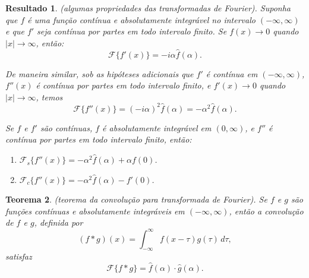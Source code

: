 \documentclass{article}
\theoremstyle{plain}
\newtheorem{thm}{Teorema}[section]
\newtheorem{res}[thm]{Resultado}
\theoremstyle{definition}
\theoremstyle{remark}
\begin{document}
\begin{res} (algumas propriedades das transformadas de Fourier).
    Suponha que \(f\) é uma função contínua e absolutamente integrável no intervalo \((-\infty, \infty)\) e que \(f'\) seja contínua por partes em todo intervalo finito. Se \(f(x) \to 0\) quando \(|x| \to \infty\), então:
    \begin{equation}
        \mathcal{F}\{f'(x)\} = -i\alpha \widehat{f}(\alpha).
    \end{equation}

    De maneira similar, sob as hipóteses adicionais que \(f'\) é contínua em \((-\infty, \infty)\), \(f''(x)\) é contínua por partes em todo intervalo finito, e \(f'(x) \to 0\) quando \(|x| \to \infty\), temos 
    \begin{equation}
        \mathcal{F}\{f''(x)\} = (-i\alpha)^2 \widehat{f}(\alpha) = -\alpha^2 \widehat{f}(\alpha).
    \end{equation}

    Se \(f\) e \(f'\) são contínuas, \(f\) é absolutamente integrável em \((0, \infty)\), e \(f''\) é contínua por partes em todo intervalo finito, então:
    \begin{enumerate}
        \item [\textup{(a)}] \(\mathcal{F}_s\{f''(x)\} = -\alpha^2 \widehat{f}(\alpha) + \alpha f(0)\).
        \item [\textup{(b)}] \(\mathcal{F}_c\{f''(x)\} = -\alpha^2 \widehat{f}(\alpha) - f'(0)\).
    \end{enumerate}
\end{res}

\begin{thm} (teorema da convolução para transformada de Fourier).
    Se \(f\) e \(g\) são funções contínuas e absolutamente integráveis em \((-\infty, \infty)\), então a convolução de \(f\) e \(g\), definida por
    \begin{equation}
        (f * g)(x) = \int_{-\infty}^{\infty} f(x - \tau) g(\tau) \, d\tau,
    \end{equation}
    \noindent satisfaz
    \begin{equation}
        \mathcal{F}\{f * g\} = \widehat{f}(\alpha) \cdot \widehat{g}(\alpha).
    \end{equation}
\end{thm}
\end{document}

